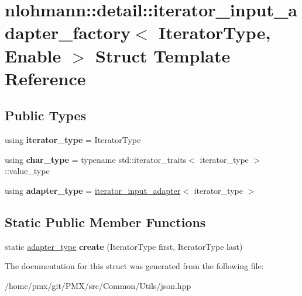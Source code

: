 \hypertarget{structnlohmann_1_1detail_1_1iterator__input__adapter__factory}{}\section{nlohmann\+:\+:detail\+:\+:iterator\+\_\+input\+\_\+adapter\+\_\+factory$<$ Iterator\+Type, Enable $>$ Struct Template Reference}
\label{structnlohmann_1_1detail_1_1iterator__input__adapter__factory}
\subsection*{Public Types}
\begin{DoxyCompactItemize}
\item 
\mbox{\label{structnlohmann_1_1detail_1_1iterator__input__adapter__factory_a37663ca283012236415d53145da1a0f9}} 
using {\bfseries iterator\+\_\+type} = Iterator\+Type
\item 
\mbox{\label{structnlohmann_1_1detail_1_1iterator__input__adapter__factory_a1439c0eda85f5f67199374d3254b8f2a}} 
using {\bfseries char\+\_\+type} = typename std\+::iterator\+\_\+traits$<$ iterator\+\_\+type $>$\+::value\+\_\+type
\item 
\mbox{\label{structnlohmann_1_1detail_1_1iterator__input__adapter__factory_a264935c57ca29dfb5153ade55266d1fa}} 
using {\bfseries adapter\+\_\+type} = \hyperlink{classnlohmann_1_1detail_1_1iterator__input__adapter}{iterator\+\_\+input\+\_\+adapter}$<$ iterator\+\_\+type $>$
\end{DoxyCompactItemize}
\subsection*{Static Public Member Functions}
\begin{DoxyCompactItemize}
\item 
\mbox{\label{structnlohmann_1_1detail_1_1iterator__input__adapter__factory_a1d3a80249cf837448966319310be9ec4}} 
static \hyperlink{classnlohmann_1_1detail_1_1iterator__input__adapter}{adapter\+\_\+type} {\bfseries create} (Iterator\+Type first, Iterator\+Type last)
\end{DoxyCompactItemize}


The documentation for this struct was generated from the following file\+:\begin{DoxyCompactItemize}
\item 
/home/pmx/git/\+P\+M\+X/src/\+Common/\+Utils/json.\+hpp\end{DoxyCompactItemize}
